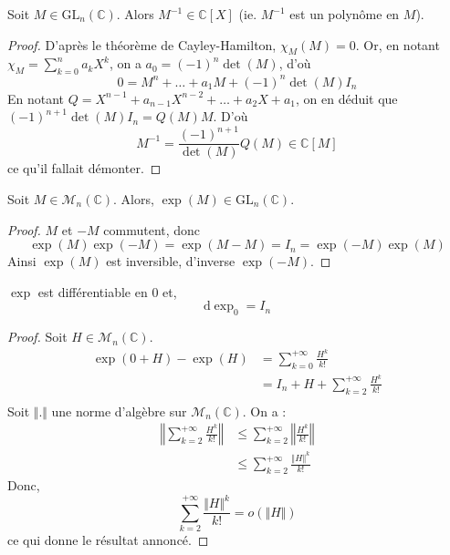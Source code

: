 






  \begin{lemma}
    \label{surjectivite-de-l-exponentielle-1}
    Soit $M \in \mathrm{GL}_n(\mathbb{C})$. Alors $M^{-1} \in \mathbb{C}[X]$ (ie. $M^{-1}$ est un polynôme en $M$).
  \end{lemma}

  \begin{proof}
    D'après le théorème de Cayley-Hamilton, $\chi_M(M) = 0$. Or, en notant $\chi_M = \sum_{k=0}^n a_k X^k$, on a $a_0 = (-1)^n \det(M)$, d'où
    \[ 0 = M^n + \dots + a_1 M + (-1)^n \det(M) I_n \]
    En notant $Q = X^{n-1} + a_{n-1}X^{n-2} + \dots + a_2 X + a_1$, on en déduit que $(-1)^{n+1} \det(M) I_n = Q(M)M$. D'où
    \[ M^{-1} = \frac{(-1)^{n+1}}{\det(M)} Q(M) \in \mathbb{C}[M] \]
    ce qu'il fallait démonter.
  \end{proof}

  \begin{lemma}
    \label{surjectivite-de-l-exponentielle-2}
    Soit $M \in \mathcal{M}_n(\mathbb{C})$. Alors, $\exp(M) \in \mathrm{GL}_n(\mathbb{C})$.
  \end{lemma}

  \begin{proof}
    $M$ et $-M$ commutent, donc
    \[ \exp(M)\exp(-M) = \exp(M-M) = I_n = \exp(-M)\exp(M) \]
    Ainsi $\exp(M)$ est inversible, d'inverse $\exp(-M)$.
  \end{proof}

  \begin{lemma}
    \label{surjectivite-de-l-exponentielle-3}
    $\exp$ est différentiable en $0$ et,
    \[ \mathrm{d}\exp_0 = I_n \]
  \end{lemma}

  \begin{proof}
    Soit $H \in \mathcal{M}_n(\mathbb{C})$.
    \begin{align*}
      \exp(0+H) - \exp(H) &= \sum_{k=0}^{+\infty} \frac{H^k}{k!} \\
      &= I_n + H + \sum_{k=2}^{+\infty} \frac{H^k}{k!} \\
    \end{align*}
    Soit $\Vert . \Vert$ une norme d'algèbre sur $\mathcal{M}_n(\mathbb{C})$. On a :
    \begin{align*}
      \left\Vert \sum_{k=2}^{+\infty} \frac{H^k}{k!} \right\Vert &\leq \sum_{k=2}^{+\infty} \left\Vert \frac{H^k}{k!} \right\Vert \\
      &\leq \sum_{k=2}^{+\infty} \frac{\Vert H \Vert^k}{k!}
    \end{align*}
    Donc,
    \[ \sum_{k=2}^{+\infty} \frac{\Vert H \Vert^k}{k!} = o(\Vert H \Vert) \]
    ce qui donne le résultat annoncé.
  \end{proof}

